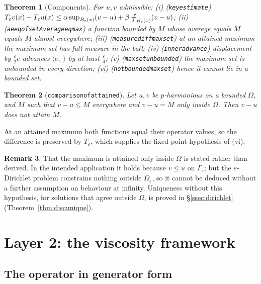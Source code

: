 \documentclass[11pt,reqno]{amsart}
\newcommand{\fint}{\mathop{\mathrlap{\,\rule[0.62ex]{0.62em}{0.5pt}}\int}}
\newcommand{\LEANREF}[1]{\texttt{\small\def\_{\textunderscore\allowbreak}#1}}
\newcommand{\eps}{\varepsilon}
\newcommand{\Op}{T_\eps}
\newcommand{\avgint}{\fint}
\theoremstyle{plain}
\newtheorem{theorem}{Theorem}[section]
\theoremstyle{definition}
\newtheorem{remark}[theorem]{Remark}
\begin{document}
\begin{theorem}[Components]\label{thm:comparison}
For $u,v$ admissible:
\emph{(i)} \emph{(\LEANREF{key\_estimate})}
$\Op v(x) - \Op u(x) \le \alpha \sup_{B_\eps(x)}(v-u)
  + \beta \avgint_{B_\eps(x)}(v-u)$;
\emph{(ii)} \emph{(\LEANREF{ae\_eq\_of\_setAverage\_eq\_max})} a function
bounded by $M$ whose average equals $M$ equals $M$ almost everywhere;
\emph{(iii)} \emph{(\LEANREF{measure\_diff\_max\_set})} at an attained maximum
the maximum set has full measure in the ball;
\emph{(iv)} \emph{(\LEANREF{inner\_advance})} displacement by
$\tfrac{\eps}{2}e$ advances $\langle e,\cdot\rangle$ by at least
$\tfrac{\eps}{4}$;
\emph{(v)} \emph{(\LEANREF{max\_set\_unbounded})} the maximum set is unbounded
in every direction;
\emph{(vi)} \emph{(\LEANREF{not\_bounded\_max\_set})} hence it cannot lie in a
bounded set.
\end{theorem}

\begin{theorem}[\LEANREF{comparison\_of\_attained}]\label{thm:comparisonfinal}
Let $u,v$ be $p$-harmonious on a bounded $\Omega$, and $M$ such that
$v-u \le M$ everywhere and $v-u=M$ only inside $\Omega$. Then $v-u$ does not
attain $M$.
\end{theorem}

At an attained maximum both functions equal their operator values, so the
difference is preserved by $\Op$, which supplies the fixed-point hypothesis of
(vi).

\begin{remark}\label{rem:hmax}
That the maximum is attained only inside $\Omega$ is stated rather than
derived. In the intended application it holds because $v \le u$ on
$\Gamma_\eps$; but the $\eps$-Dirichlet problem constrains nothing outside
$\Omega_\eps$, so it cannot be deduced without a further assumption on
behaviour at infinity. Uniqueness without this hypothesis, for solutions that
agree outside $\Omega$, is proved in \S\ref{ssec:dirichlet}
(Theorem~\ref{thm:discunique}).
\end{remark}

\section{Layer 2: the viscosity framework}\label{sec:layer2}

\subsection{The operator in generator form}
\end{document}
